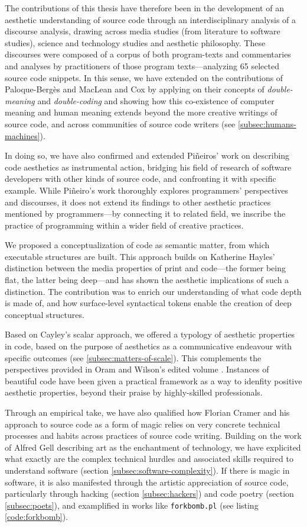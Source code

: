 The contributions of this thesis have therefore been in the development of an aesthetic understanding of source code through an interdisciplinary analysis of a discourse analysis, drawing across media studies (from literature to software studies), science and technology studies and aesthetic philosophy. These discourses were composed of a corpus of both program-texts and commentaries and analyses by practitioners of those program texts—analyzing 65  selected source code snippets. In this sense, we have extended on the contributions of Paloque-Bergès and MacLean and Cox by applying on their concepts of \emph{double-meaning}  and \emph{double-coding} and showing how this co-existence of computer meaning and human meaning extends beyond the more creative writings of source code, and across communities of source code writers (see \ref{subsec:humans-machines}).

In doing so, we have also confirmed and extended Piñeiros' work on describing code aesthetics as instrumental action, bridging his field of research of software developers with other kinds of source code, and confronting it with specific example. While Piñeiro's work thoroughly explores programmers' perspectives and discourses, it does not extend its findings to other aesthetic practices mentioned by programmers—by connecting it to related field, we inscribe the practice of programming within a wider field of creative practices.

We proposed a conceptualization of code as semantic matter, from which executable structures are built. This approach builds on Katherine Hayles' distinction between the media properties of print and code—the former being flat, the latter being deep—and has shown the aesthetic implications of such a distinction. The contribution was to enrich our understanding of what code depth is made of, and how surface-level syntactical tokens enable the creation of deep conceptual structures.

Based on Cayley's scalar approach, we offered a typology of aesthetic properties in code, based on the purpose of aesthetics as a communicative endeavour with specific outcomes (see \ref{subsec:matters-of-scale}). This complements the perspectives provided in Oram and Wilson's edited volume \citep{oram_beautiful_2007}. Instances of beautiful code have been given a practical framework as a way to idenfity positive aesthetic properties, beyond their praise by highly-skilled professionals.

Through an empirical take, we have also qualified how Florian Cramer and his approach to source code as a form of magic relies on very concrete technical processes and habits across practices of source code writing. Building on the work of Alfred Gell describing art as the enchantment of technology, we have explicited what exactly are the complex technical hurdles and associated skills required to understand software (section \ref{subsec:software-complexity}). If there is magic in software, it is also manifested through the artistic appreciation of source code, particularly through hacking (section \ref{subsec:hackers}) and code poetry (section \ref{subsec:poets}), and examplified in works like \lstinline{forkbomb.pl} (see listing \ref{code:forkbomb}).

